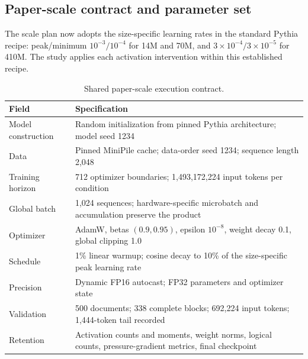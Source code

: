 \documentclass[10pt,a4paper]{article}
\begin{document}
\subsection{Paper-scale contract and parameter set}

The scale plan now adopts the size-specific learning rates in the standard Pythia recipe: peak/minimum $10^{-3}/10^{-4}$ for 14M and 70M, and $3\times10^{-4}/3\times10^{-5}$ for 410M. The study applies each activation intervention within this established recipe.

{\small
\begin{table}[htbp]
\centering
\caption{Shared paper-scale execution contract.}
\label{tab:contract}
\begin{tabularx}{\textwidth}{@{}p{37mm}Y@{}}
\toprule
\textbf{Field} & \textbf{Specification} \\
\midrule
Model construction & Random initialization from pinned Pythia architecture; model seed 1234 \\
Data & Pinned MiniPile cache; data-order seed 1234; sequence length 2,048 \\
Training horizon & 712 optimizer boundaries; 1,493,172,224 input tokens per condition \\
Global batch & 1,024 sequences; hardware-specific microbatch and accumulation preserve the product \\
Optimizer & AdamW, betas $(0.9,0.95)$, epsilon $10^{-8}$, weight decay 0.1, global clipping 1.0 \\
Schedule & 1\% linear warmup; cosine decay to 10\% of the size-specific peak learning rate \\
Precision & Dynamic FP16 autocast; FP32 parameters and optimizer state \\
Validation & 500 documents; 338 complete blocks; 692,224 input tokens; 1,444-token tail recorded \\
Retention & Activation counts and moments, weight norms, logical counts, pressure-gradient metrics, final checkpoint \\
\bottomrule
\end{tabularx}
\end{table}

}
\end{document}
